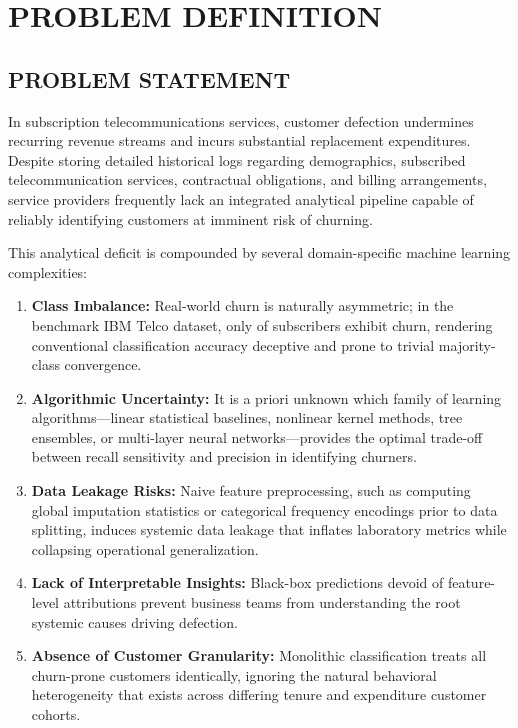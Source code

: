 \chapter{PROBLEM DEFINITION}

\section{PROBLEM STATEMENT}
In subscription telecommunications services, customer defection undermines recurring revenue streams and incurs substantial replacement expenditures. Despite storing detailed historical logs regarding demographics, subscribed telecommunication services, contractual obligations, and billing arrangements, service providers frequently lack an integrated analytical pipeline capable of reliably identifying customers at imminent risk of churning. 

This analytical deficit is compounded by several domain-specific machine learning complexities:
\begin{enumerate}
    \item \textbf{Class Imbalance:} Real-world churn is naturally asymmetric; in the benchmark IBM Telco dataset, only \datasetChurnProportion{} of subscribers exhibit churn, rendering conventional classification accuracy deceptive and prone to trivial majority-class convergence.
    \item \textbf{Algorithmic Uncertainty:} It is a priori unknown which family of learning algorithms---linear statistical baselines, nonlinear kernel methods, tree ensembles, or multi-layer neural networks---provides the optimal trade-off between recall sensitivity and precision in identifying churners.
    \item \textbf{Data Leakage Risks:} Naive feature preprocessing, such as computing global imputation statistics or categorical frequency encodings prior to data splitting, induces systemic data leakage that inflates laboratory metrics while collapsing operational generalization.
    \item \textbf{Lack of Interpretable Insights:} Black-box predictions devoid of feature-level attributions prevent business teams from understanding the root systemic causes driving defection.
    \item \textbf{Absence of Customer Granularity:} Monolithic classification treats all churn-prone customers identically, ignoring the natural behavioral heterogeneity that exists across differing tenure and expenditure customer cohorts.
\end{enumerate}


